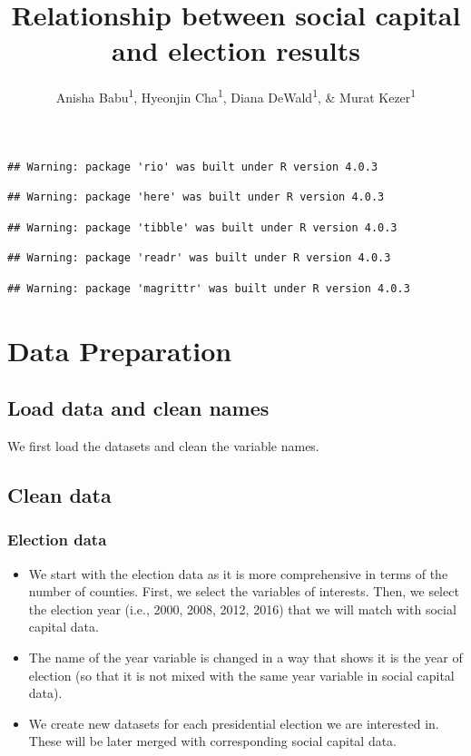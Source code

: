 \documentclass[
  english,
  man]{apa6}
\title{Relationship between social capital and election results}
\author{Anisha Babu\textsuperscript{1}, Hyeonjin Cha\textsuperscript{1}, Diana DeWald\textsuperscript{1}, \& Murat Kezer\textsuperscript{1}}
\date{}
\affiliation{\vspace{0.5cm}\textsuperscript{1} University of Oregon}
\begin{document}
\maketitle

\begin{verbatim}
## Warning: package 'rio' was built under R version 4.0.3
\end{verbatim}

\begin{verbatim}
## Warning: package 'here' was built under R version 4.0.3
\end{verbatim}

\begin{verbatim}
## Warning: package 'tibble' was built under R version 4.0.3
\end{verbatim}

\begin{verbatim}
## Warning: package 'readr' was built under R version 4.0.3
\end{verbatim}

\begin{verbatim}
## Warning: package 'magrittr' was built under R version 4.0.3
\end{verbatim}

\hypertarget{data-preparation}{%
\section{Data Preparation}\label{data-preparation}}

\hypertarget{load-data-and-clean-names}{%
\subsection{Load data and clean names}\label{load-data-and-clean-names}}

We first load the datasets and clean the variable names.

\hypertarget{clean-data}{%
\subsection{Clean data}\label{clean-data}}

\hypertarget{election-data}{%
\subsubsection{Election data}\label{election-data}}

\begin{itemize}
\item
  We start with the election data as it is more comprehensive in terms of the number of counties. First, we select the variables of interests. Then, we select the election year (i.e., 2000, 2008, 2012, 2016) that we will match with social capital data.
\item
  The name of the year variable is changed in a way that shows it is the year of election (so that it is not mixed with the same year variable in social capital data).
\item
  We create new datasets for each presidential election we are interested in. These will be later merged with corresponding social capital data.
\end{itemize}
\end{document}
